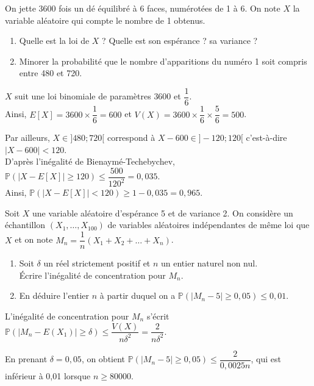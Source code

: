 \documentclass[11pt,fleqn, openany]{book} %
\begin{document}
\begin{exercise}[topic=lgn03]On jette 3600 fois un dé équilibré à 6 faces,  numérotées de 1 à 6. On note $X$ la variable aléatoire qui compte le nombre de 1 obtenus.
\begin{enumerate}
\item Quelle est la loi de $X$ ? Quelle est son espérance ? sa variance ?
\item Minorer la probabilité que le nombre d'apparitions du numéro 1 soit compris entre 480 et 720.\end{enumerate}\end{exercise}

\begin{solution}$X$ suit une loi binomiale de paramètres $3600$ et $\dfrac{1}{6}$. \\Ainsi, $E[X]=3600 \times \dfrac{1}{6} = 600$ et $V(X)=3600 \times \dfrac{1}{6} \times \dfrac{5}{6}=500$.

Par ailleurs, $X \in ]480;720[$ correspond à $X-600 \in ]-120;120[$ c'est-à-dire $|X-600| < 120$. \\D'après l'inégalité de Bienaymé-Techebychev, 
$\mathbb{P}(|X-E[X]| \geqslant 120) \leqslant \dfrac{500}{120^2}=0,035$. \\Ainsi, $\mathbb{P}(|X-E[X]| < 120) \geqslant 1-0,035 = 0,965$.\end{solution}




\begin{exercise}[topic=lgn03]Soit $X$ une variable aléatoire d'espérance 5 et de variance 2. On considère un échantillon $(X_1, \ldots, X_{100})$ de variables aléatoires indépendantes de même loi que $X$ et on note $M_n = \dfrac{1}{n} (X_1+X_2+\ldots + X_n)$.
\begin{enumerate}
\item Soit $\delta$ un réel strictement positif et $n$ un entier naturel non nul. \\ Écrire l'inégalité de concentration pour $M_n$.
\item En déduire l'entier $n$ à partir duquel on a $\mathbb{P}(|M_n-5|\geqslant 0,05 ) \leqslant 0,01$.
\end{enumerate}\end{exercise}

\begin{solution}L'inégalité de concentration pour $M_n$ s'écrit $\mathbb{P}(|M_n-E(X_1)|\geqslant \delta )\leqslant \dfrac{V(X)}{n\delta ^2}=\dfrac{2}{n\delta ^2}$.

En prenant $\delta = 0,05$, on obtient $\mathbb{P}(|M_n-5|\geqslant 0,05 ) \leqslant \dfrac{2}{0,0025n}$, qui est inférieur à 0,01 lorsque $n\geqslant 80000$.\end{solution}
\end{document}
